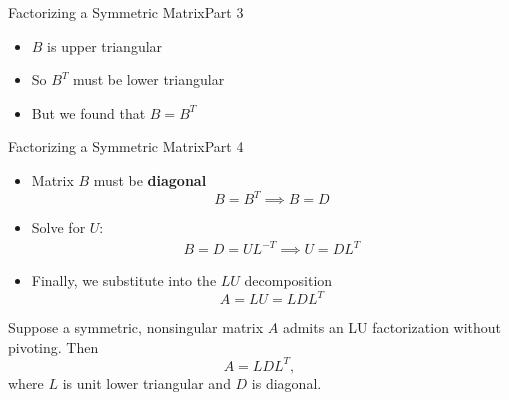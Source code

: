 \documentclass[10pt]{beamer}
\begin{document}
\begin{frame}{Factorizing a Symmetric Matrix}{Part 3}
\begin{itemize}
    \item $B$ is upper triangular
        \vfill 
    \item So $B^T$ must be lower triangular
        \vfill 
    \item But we found that $B=B^T$
        \vfill 
\end{itemize}


\end{frame}


\begin{frame}{Factorizing a Symmetric Matrix}{Part 4}
\begin{itemize}

    \item Matrix $B$ must be \textbf{diagonal}
        $$B = B^T \implies B  = D $$
    \item Solve for $U$:
    \begin{align}
        B=D=UL^{-T} \implies U=DL^T
    \end{align}

    \item Finally, we substitute into the $LU$ decomposition
        $$A = LU = LDL^T$$
\end{itemize}

\begin{theorem}    
Suppose a symmetric, nonsingular matrix $A$ admits an LU
factorization without pivoting. Then
\[
    A = LDL^T,
\]
where $L$ is unit lower triangular and $D$ is diagonal.
\end{theorem}

\end{frame}
\end{document}
